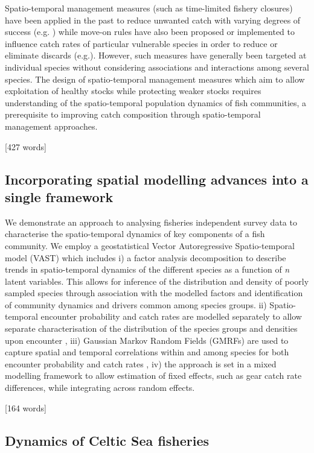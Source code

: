 \documentclass{nature}
\begin{document}
\begin{linenumbers}
Spatio-temporal management measures (such as time-limited fishery closures)
have been applied in the past to reduce unwanted catch with varying degrees of
success (e.g. \cite{Needle2011, Holmes2011, Beare2010, Dinmore2003}) while
move-on rules have also been proposed or implemented to influence catch rates
of particular vulnerable species in order to reduce or eliminate discards
(e.g.\cite{Gardner2008, Dunn2011, Dunn2014a}). However, such measures have
generally been targeted at individual species without considering associations
and interactions among several species. The design of spatio-temporal
management measures which aim to allow exploitation of healthy stocks while
protecting weaker stocks requires understanding of the spatio-temporal
population dynamics of fish communities, a prerequisite to improving catch
composition through spatio-temporal management approaches. 

[427 words]

\subsection{Incorporating spatial modelling advances into a single framework}

We demonstrate an approach to analysing fisheries independent survey data to
characterise the spatio-temporal dynamics of key components of a fish
community. We employ a geostatistical Vector Autoregressive Spatio-temporal
model (VAST) which includes i) a factor analysis decomposition to describe
trends in spatio-temporal dynamics of the different species as a function of
\textit{n} latent variables\cite{Thorson2015}. This allows for inference of the
distribution and density of poorly sampled species through association with the
modelled factors and identification of community dynamics and drivers common
among species groups. ii) Spatio-temporal encounter probability and catch rates
are modelled separately to allow separate characterisation of the distribution
of the species groups and densities upon encounter \cite{Thorson2015a}, iii)
Gaussian Markov Random Fields (GMRFs) are used to capture spatial and temporal
correlations within and among species for both encounter probability and catch
rates \cite{Thorson2013}, iv) the approach is set in a mixed modelling
framework to allow estimation of fixed effects, such as gear catch rate
differences, while integrating across random effects.

[164 words]

\subsection{Dynamics of Celtic Sea fisheries}


\end{linenumbers}
\end{document}
